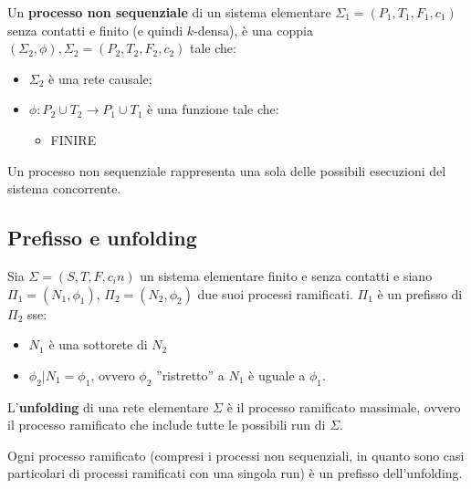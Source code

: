 \begin{defn}
    Un \textbf{processo non sequenziale} di un sistema elementare
    $\Sigma_1 = (P_1, T_1, F_1, c_1)$ senza contatti e finito (e quindi $k$-densa),
    è una coppia $(\Sigma_2, \phi), \Sigma_2 = (P_2, T_2, F_2, c_2)$ tale che:
    \begin{itemize}
        \item $\Sigma_2$ è una rete causale;
        \item $\phi: P_2 \cup T_2 \rightarrow P_1 \cup T_1$ è una funzione tale che:
        \begin{itemize}
            \item FINIRE
        \end{itemize}
    \end{itemize}
\end{defn}

\begin{rem}
    Un processo non sequenziale rappresenta una sola delle possibili
    esecuzioni del sistema concorrente.
\end{rem}

\subsection*{Prefisso e unfolding}
\begin{defn}
    Sia $\Sigma = (S, T , F , c_in)$ un sistema elementare finito e senza contatti
    e siano $\Pi_1 = (N_1, \phi_1)$, $\Pi_2 = (N_2, \phi_2)$ due suoi processi
    ramificati.
    $\Pi_1$ è un prefisso di $\Pi_2$ sse:
    \begin{itemize}
        \item $N_1$ è una sottorete di $N_2$
        \item $\phi_2|N_1 = \phi_1$, ovvero $\phi_2$ ”ristretto” a $N_1$ è
        uguale a $\phi_1$.
    \end{itemize}
\end{defn}

\begin{defn}
    L'\textbf{unfolding} di una rete elementare $\Sigma$ è il processo ramificato
    massimale, ovvero il processo ramificato che include tutte le possibili
    run di $\Sigma$.
\end{defn}

\begin{rem}
    Ogni processo ramificato (compresi i processi non sequenziali, in quanto
    sono casi particolari di processi ramificati con una singola run) è un
    prefisso dell'unfolding.
\end{rem}

